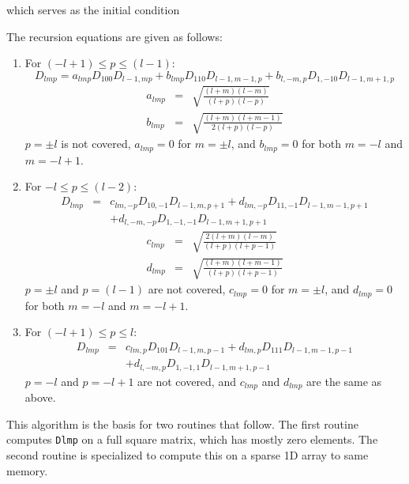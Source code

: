 \noindent which serves as the initial condition

The recursion equations are given as follows: 
\begin{enumerate}
\item For $(-l+1) \leq p \leq (l-1)$:
\begin{equation}
D_{lmp} = a_{lmp}D_{100}D_{l-1,mp}+b_{lmp}D_{110}D_{l-1,m-1,p}+b_{l,-m,p}D_{1,-10}D_{l-1,m+1,p}
\end{equation}
\begin{eqnarray}
a_{lmp} &=& \sqrt{\frac{(l+m)(l-m)}{(l+p)(l-p)}} \\
b_{lmp} &=& \sqrt{\frac{(l+m)(l+m-1)}{2(l+p)(l-p)}} 
\end{eqnarray}
$p = \pm l$ is not covered, $a_{lmp} = 0$ for $m=\pm l$, and $b_{lmp} = 0$ for both $m=-l$ and $m=-l+1$.

\item For $-l \leq p \leq (l-2)$:
\begin{eqnarray}
D_{lmp} &=& c_{lm,-p}D_{10,-1}D_{l-1,m,p+1}+d_{lm,-p}D_{11,-1}D_{l-1,m-1,p+1} \nonumber \\
\ & \ & +d_{l,-m,-p}D_{1,-1,-1}D_{l-1,m+1,p+1}
\end{eqnarray}
\begin{eqnarray}
c_{lmp} &=& \sqrt{\frac{2(l+m)(l-m)}{(l+p)(l+p-1)}} \\
d_{lmp} &=& \sqrt{\frac{(l+m)(l+m-1)}{(l+p)(l+p-1)}} 
\end{eqnarray}
$p = \pm l$ and $p=(l-1)$ are not covered, $c_{lmp} = 0$ for $m=\pm l$, and $d_{lmp} = 0$ for both $m=-l$ and $m=-l+1$.

\item For $(-l+1) \leq p \leq l$:
\begin{eqnarray}
D_{lmp} &= &c_{lm,p}D_{101}D_{l-1,m,p-1}+d_{lm,p}D_{111}D_{l-1,m-1,p-1} \nonumber \\
\ & \ & +d_{l,-m,p}D_{1,-1,1}D_{l-1,m+1,p-1}
\end{eqnarray}
$p = -l$ and $p = -l+1$ are not covered, and $c_{lmp}$ and $d_{lmp}$ are the same as above.
\end{enumerate}

This algorithm is the basis for two routines that follow. The first routine computes \texttt{Dlmp} on a full square matrix, which has mostly zero elements. The second routine is specialized to compute this on a sparse 1D array to same memory.  

